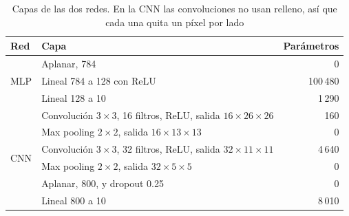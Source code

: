\documentclass[11pt,letterpaper]{article}
\begin{document}
\begin{table}[!htb]
    \centering
    \caption{Capas de las dos redes. En la CNN las convoluciones no usan relleno, así que cada una quita un píxel por lado}
    \label{tab:arq}
    \footnotesize
    \begin{tabular}{llr}
        \toprule
        \textbf{Red} & \textbf{Capa} & \textbf{Parámetros} \\
        \midrule
        \multirow{3}{*}{MLP} & Aplanar, 784 & 0 \\
                             & Lineal 784 a 128 con ReLU & 100\,480 \\
                             & Lineal 128 a 10 & 1\,290 \\
        \midrule
        \multirow{6}{*}{CNN} & Convolución $3\times3$, 16 filtros, ReLU, salida $16\times26\times26$ & 160 \\
                             & Max pooling $2\times2$, salida $16\times13\times13$ & 0 \\
                             & Convolución $3\times3$, 32 filtros, ReLU, salida $32\times11\times11$ & 4\,640 \\
                             & Max pooling $2\times2$, salida $32\times5\times5$ & 0 \\
                             & Aplanar, 800, y dropout 0.25 & 0 \\
                             & Lineal 800 a 10 & 8\,010 \\
        \bottomrule
    \end{tabular}
\end{table}
\end{document}
